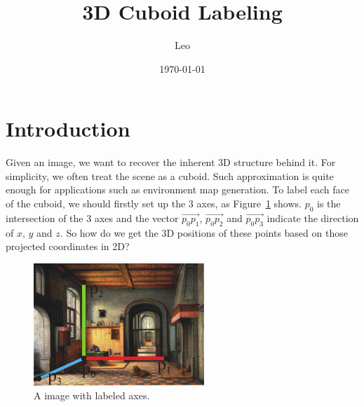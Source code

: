 \documentclass[a4paper]{article}
\title{3D Cuboid Labeling}
\author{Leo}
\date{\today}
\begin{document}
\maketitle


\section{Introduction}
Given an image, we want to recover the inherent 3D structure behind it.
For simplicity, we often treat the scene as a cuboid. Such approximation is quite enough for applications such as environment map generation.
To label each face of the cuboid, we should firstly set up the 3 axes, as Figure~\ref{fig1} shows.
$p_0$ is the intersection of the 3 axes and the vector $\overrightarrow{p_0p_1}$, $\overrightarrow{p_0p_2}$ and $\overrightarrow{p_0p_3}$ indicate the direction of $x$, $y$ and $z$.
So how do we get the 3D positions of these points based on those projected coordinates in 2D?
\begin{figure}[h]
\centering
\includegraphics[width=1.0\linewidth]{images/fig.pdf}
\caption{A image with labeled axes.}
\label{fig1}
\end{figure}
\end{document}
